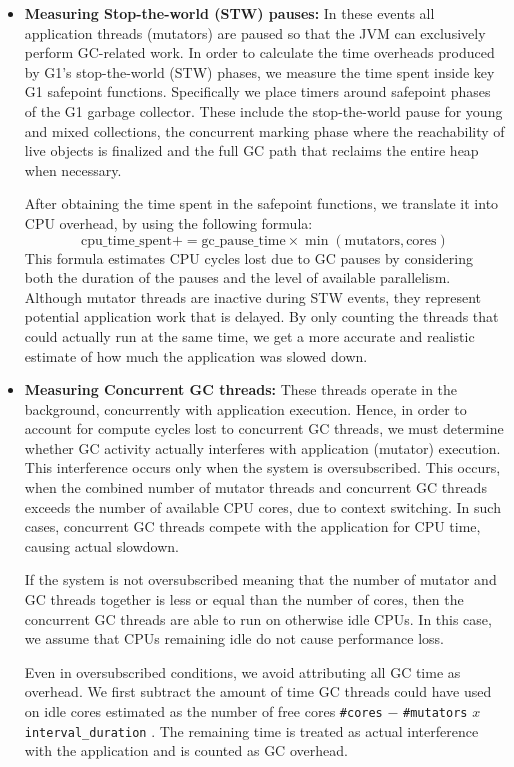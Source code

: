 \begin{itemize}
  \item \textbf{Measuring Stop-the-world (STW) pauses:} In these events
  all application threads (mutators) are paused so that the JVM can exclusively perform 
  GC-related work. In order to calculate the time overheads produced by G1’s stop-the-world (STW) phases,
  we measure the time spent inside key G1 safepoint functions. 
  Specifically we place timers around safepoint phases of the G1 garbage collector. 
  These include the stop-the-world pause for young and mixed collections, the concurrent 
  marking phase where the reachability of live objects is finalized and the full GC path
  that reclaims the entire heap when necessary. 

  After obtaining the time spent in the safepoint functions, we translate it into CPU overhead, by using the following formula:
  \[
  \text{cpu\_time\_spent} += \text{gc\_pause\_time} \times \min(\text{mutators}, \text{cores})
  \]
  This formula estimates CPU cycles lost due to GC pauses by considering both the duration of the pauses and the level of available parallelism. 
  Although mutator threads are inactive during STW events, they represent potential application work that is delayed. 
  By only counting the threads that could actually run at the same time, we get a more accurate and realistic estimate of how much the application was slowed down. 

  \item \textbf{Measuring Concurrent GC threads:} These threads operate in the background,
  concurrently with application execution. 
  Hence, in order to account for compute cycles lost to concurrent GC threads, 
  we must determine whether GC activity actually interferes with 
  application (mutator) execution. This interference occurs only when 
  the system is oversubscribed. This occurs, when the combined number of 
  mutator threads and concurrent GC threads exceeds the number of available 
  CPU cores, due to context switching. In such cases, concurrent GC threads compete with the application 
  for CPU time, causing actual slowdown.

  If the system is not oversubscribed meaning that the number of mutator and GC
  threads together is less or equal than the number of cores, then the concurrent 
  GC threads are able to run on otherwise idle CPUs. In this case, we assume that
  CPUs remaining idle do not cause performance loss.

  Even in oversubscribed conditions, we avoid attributing all GC time as overhead.
  We first subtract the amount of time GC threads could have used on idle cores estimated 
  as the number of free cores \texttt{\#cores} $-$ \texttt{\#mutators} $x$ \texttt{interval\_duration} .
  The remaining time is treated as actual interference with the
  application and is counted as GC overhead.


\end{itemize}
